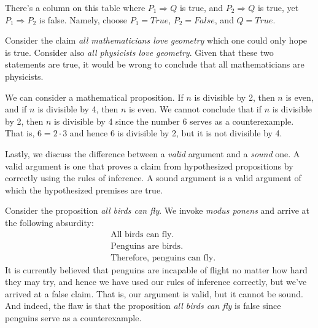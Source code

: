         There's a column on this table where $P_{1}\Rightarrow{Q}$ is true, and
        $P_{2}\Rightarrow{Q}$ is true, yet $P_{1}\Rightarrow{P}_{2}$ is false.
        Namely, choose $P_{1}=True$, $P_{2}=False$, and $Q=True$.
        \begin{example}
            Consider the claim \textit{all mathematicians love geometry} which
            one could only hope is true. Consider also
            \textit{all physicists love geometry}. Given that these two
            statements are true, it would be wrong to conclude that all
            mathematicians are physicists.
        \end{example}
        \begin{example}
            We can consider a mathematical proposition. If $n$ is divisible by
            2, then $n$ is even, and if $n$ is divisible by 4, then $n$ is even.
            We cannot conclude that if $n$ is divisible by 2, then $n$ is
            divisible by 4 since the number 6 serves as a counterexample. That
            is, $6=2\cdot{3}$ and hence 6 is divisible by 2, but it is not
            divisible by 4.
        \end{example}
        Lastly, we discuss the difference between a \textit{valid} argument and
        a \textit{sound} one. A valid argument is one that proves a claim from
        hypothesized propositions by correctly using the rules of inference. A
        sound argument is a valid argument of which the hypothesized
        premises are true.
        \begin{example}
            Consider the proposition \textit{all birds can fly}. We invoke
            \textit{modus ponens} and arrive at the following absurdity:
            \begin{subequations}
                \begin{align}
                    &\text{All birds can fly}.\\
                    &\text{Penguins are birds}.\\
                    &\text{Therefore, penguins can fly}.
                \end{align}
            \end{subequations}
            It is currently believed that penguins are incapable of flight no
            matter how hard they may try, and hence we have used our rules of
            inference correctly, but we've arrived at a false claim. That is,
            our argument is valid, but it cannot be sound. And indeed, the flaw
            is that the proposition \textit{all birds can fly} is false since
            penguins serve as a counterexample.
        \end{example}
